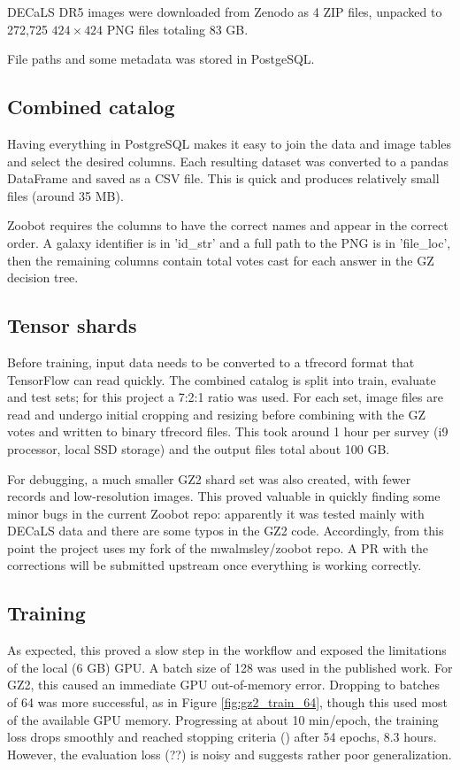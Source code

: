 \documentclass[twocolumn, twocolappendix, tighten]{aastex631}
\newcommand{\todo}{\color{red}{TODO}\color{black}\hspace{2mm}}
\begin{document}
DECaLS DR5 images were downloaded from Zenodo \citep{walmsley_mike_2020_4573248} as 4 ZIP files, unpacked to 272,725 $424 \times 424$ PNG files totaling 83 GB. 

File paths and some metadata was stored in PostgeSQL.

\subsection{Combined catalog}

Having everything in PostgreSQL makes it easy to join the data and image tables and select the desired columns. Each resulting dataset was converted to a pandas DataFrame and saved as a CSV file. This is quick and produces relatively small files (around 35 MB).

Zoobot requires the columns to have the correct names and appear in the correct order. A galaxy identifier is in 'id\_str' and a full path to the PNG is in 'file\_loc', then the remaining columns contain total votes cast for each answer in the GZ decision tree.

\subsection{Tensor shards}

Before training, input data needs to be converted to a tfrecord format that TensorFlow can read quickly. The combined catalog is split into train, evaluate and test sets; for this project a 7:2:1 ratio was used. For each set, image files are read and undergo initial cropping and resizing before combining with the GZ votes and written to binary tfrecord files. This took around 1 hour per survey (i9 processor, local SSD storage) and the output files total about 100 GB.

For debugging, a much smaller GZ2 shard set was also created, with fewer records and low-resolution images. This proved valuable in quickly finding some minor bugs in the current Zoobot repo: apparently it was tested mainly with DECaLS data and there are some typos in the GZ2 code. Accordingly, from this point the project uses my fork of the mwalmsley/zoobot repo. A PR with the corrections will be submitted upstream once everything is working correctly.

\subsection{Training}

As expected, this proved a slow step in the workflow and exposed the limitations of the local (6 GB) GPU. A batch size of 128 was used in the published work. For GZ2, this caused an immediate GPU out-of-memory error. Dropping to batches of 64 was more successful, as in Figure \ref{fig:gz2_train_64}, though this used most of the available GPU memory. Progressing at about 10 min/epoch, the training loss drops smoothly and reached stopping criteria (\todo) after 54 epochs, 8.3 hours. However, the evaluation loss (??) is noisy and suggests rather poor generalization.
\end{document}
